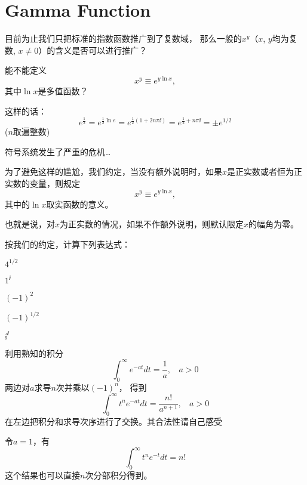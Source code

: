 \documentclass[CJK]{beamer}
\begin{document}
\section{Gamma Function}


\begin{frame}
  \bch
  
  目前为止我们只把标准的指数函数推广到了复数域，
  那么一般的$x^y$（$x$, $y$均为复数, $x\ne 0$）的含义是否可以进行推广？
  \ech
\end{frame}


\begin{frame}
  \bch
  能不能定义
  $$x^y \equiv e^{y\ln x},$$
  其中$\ln x$是多值函数？

  \skiplines
  
  这样的话：
  $$e^{\frac{1}{2}} = e^{\frac{1}{2}\ln e} = e^{\frac{1}{2}(1+2n\pi\ii)} = e^{\frac{1}{2}+n\pi\ii} = \pm e^{1/2}$$
  ($n$取遍整数)

  \skipline
  \wulian 符号系统发生了严重的危机…
  \ech
\end{frame}


\begin{frame}
  \bch
  为了避免这样的尴尬，我们约定，当没有额外说明时，{\blue 如果$x$是正实数或者恒为正实数的变量}，则规定
  $$x^y \equiv e^{y\ln x},$$
   其中的{\blue $\ln x$取实函数的意义。}


   \skiplines
   
  也就是说，对$x$为正实数的情况，如果不作额外说明，则默认限定$x$的幅角为零。
  \ech
\end{frame}

\begin{frame}
  \bch
  按我们的约定，计算下列表达式：
  \bitem
\item{$4^{1/2}$}
\item{$1^{\ii}$}  
\item{$(-1)^2$}
\item{$(-1)^{1/2}$}  
\item{$\ii^\ii$}  
  \eitem
  \ech
\end{frame}


\begin{frame}
  \bch
  利用熟知的积分
  $$\int_0^{\infty} e^{-at}  dt = \frac{1}{a}, \ \ \ \ a>0$$
  两边对$a$求导$n$次并乘以$(-1)^n$， 得到
  $$\int_0^{\infty}t^n e^{-at}  dt = \frac{n!}{a^{n+1}}, \ \ \ \ a>0$$
  {\scriptsize 在左边把积分和求导次序进行了交换。其合法性请自己感受\bye}
  
  令$a=1$，有
  {\blue
    $$\int_0^\infty t^n e^{-t} dt = n! $$ 
  }
  这个结果也可以直接$n$次分部积分得到。
  \ech
\end{frame}
\end{document}
